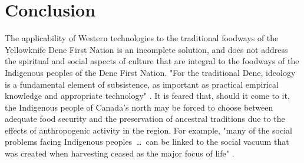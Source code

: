 \documentclass{report}
\begin{document}


\section{Conclusion}

\hspace{24pt} The applicability of Western technologies to the traditional foodways of the Yellowknife Dene First Nation is an incomplete solution, and does not address the spiritual and social aspects of culture that are integral to the foodways of the Indigenous peoples of the Dene First Nation.
"For the traditional Dene, ideology is a fundamental element of subsistence, as important as practical empirical knowledge and appropriate technology" \parencite{lorecapturingtraditional}.
It is feared that, should it come to it, the Indigenous people of Canada's north may be forced to choose between adequate food security and the preservation of ancestral traditions due to the effects of anthropogenic activity in the region. 
For example, "many of the social problems facing Indigenous peoples~\ldots~can be linked to the social vacuum that was created when harvesting ceased as the major focus of life" \parencite{socialculturalcapital}.

\clearpage

\printbibliography
\end{document}
